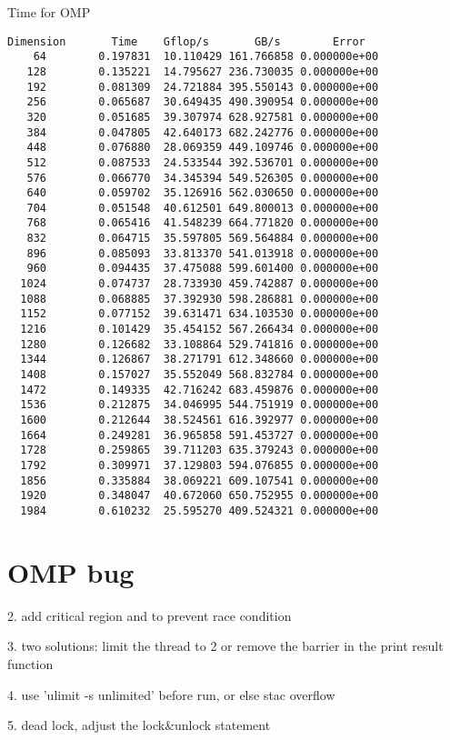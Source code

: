 \documentclass[titlepage]{article}
\begin{document}
Time for OMP
\begin{verbatim}
Dimension       Time    Gflop/s       GB/s        Error
    64        0.197831  10.110429 161.766858 0.000000e+00
   128        0.135221  14.795627 236.730035 0.000000e+00
   192        0.081309  24.721884 395.550143 0.000000e+00
   256        0.065687  30.649435 490.390954 0.000000e+00
   320        0.051685  39.307974 628.927581 0.000000e+00
   384        0.047805  42.640173 682.242776 0.000000e+00
   448        0.076880  28.069359 449.109746 0.000000e+00
   512        0.087533  24.533544 392.536701 0.000000e+00
   576        0.066770  34.345394 549.526305 0.000000e+00
   640        0.059702  35.126916 562.030650 0.000000e+00
   704        0.051548  40.612501 649.800013 0.000000e+00
   768        0.065416  41.548239 664.771820 0.000000e+00
   832        0.064715  35.597805 569.564884 0.000000e+00
   896        0.085093  33.813370 541.013918 0.000000e+00
   960        0.094435  37.475088 599.601400 0.000000e+00
  1024        0.074737  28.733930 459.742887 0.000000e+00
  1088        0.068885  37.392930 598.286881 0.000000e+00
  1152        0.077152  39.631471 634.103530 0.000000e+00
  1216        0.101429  35.454152 567.266434 0.000000e+00
  1280        0.126682  33.108864 529.741816 0.000000e+00
  1344        0.126867  38.271791 612.348660 0.000000e+00
  1408        0.157027  35.552049 568.832784 0.000000e+00
  1472        0.149335  42.716242 683.459876 0.000000e+00
  1536        0.212875  34.046995 544.751919 0.000000e+00
  1600        0.212644  38.524561 616.392977 0.000000e+00
  1664        0.249281  36.965858 591.453727 0.000000e+00
  1728        0.259865  39.711203 635.379243 0.000000e+00
  1792        0.309971  37.129803 594.076855 0.000000e+00
  1856        0.335884  38.069221 609.107541 0.000000e+00
  1920        0.348047  40.672060 650.752955 0.000000e+00
  1984        0.610232  25.595270 409.524321 0.000000e+00
\end{verbatim}

\section{OMP bug}

2. add critical region and to prevent race condition

3. two solutions: limit the thread to 2 or remove the barrier in the print result function

4. use 'ulimit -s unlimited' before run, or else stac overflow

5. dead lock, adjust the lock\&unlock statement
\end{document}
